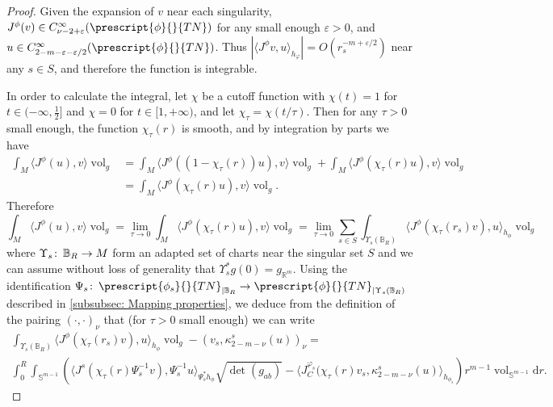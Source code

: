 \documentclass{article}
\numberwithin{equation}{section}        %
\theoremstyle{bfnote}
\theoremstyle{definition}
\theoremstyle{bfremark}
\newcommand{\col}{\colon \thinspace}        %
\newcommand{\R}{\mathbb{R}}                 %
\newcommand{\Ball}{\mathbb{B}}              %
\newcommand{\Sp}{\mathbb{S}}                %
\newcommand{\diff}{\mathrm{d}}                      %
\DeclareMathOperator{\vol}{vol}                 %
\begin{document}
\begin{proof}
    Given the expansion of $v$ near each singularity, $J^\phi(v) \in C^\infty_{\nu-2+\varepsilon}(\prescript{\phi}{}{TN})$ for any small enough $\varepsilon > 0$, and $u \in C^\infty_{2-m-\varepsilon-\varepsilon/2}(\prescript{\phi}{}{TN})$. Thus $|\langle J^\phi v, u \rangle_{h_\varphi}| = O(r_s^{-m+\varepsilon/2})$ near any $s \in S$, and therefore the function is integrable. 

    In order to calculate the integral, let $\chi$ be a cutoff function with $\chi(t) = 1$ for $t \in (-\infty,\tfrac{1}{2}]$ and $\chi = 0$ for $t \in [1,+\infty)$, and let $\chi_\tau = \chi(t/\tau)$. Then for any $\tau > 0$ small enough, the function $\chi_\tau(r)$ is smooth, and by integration by parts we have
    \begin{align*}
        \int_M \langle J^\phi(u), v \rangle \vol_{g} & = \int_M \langle J^\phi((1-\chi_\tau(r))u), v \rangle \vol_{g} + \int_M \langle J^\phi(\chi_\tau(r)u), v \rangle \vol_{g} \\
        & = \int_M \langle J^\phi(\chi_\tau(r)u), v \rangle \vol_{g} .
    \end{align*}
    Therefore
    \begin{equation*}
        \int_M \langle J^\phi(u), v \rangle \vol_{g} = \lim_{\tau \rightarrow 0} \int_M \langle J^\phi(\chi_\tau(r)u), v \rangle \vol_{g} = \lim_{\tau \rightarrow 0} \sum_{s \in S} \int_{\Upsilon_s(\Ball_R)} \langle J^\phi(\chi_\tau(r_s)v), u \rangle_{h_\phi} \vol_{g}
    \end{equation*}
    where $\Upsilon_s \col \Ball_R \to M$ form an adapted set of charts near the singular set $S$ and we can assume without loss of generality that $\Upsilon^*_sg(0) = g_{\R^m}$. Using the identification $\Psi_s \col \prescript{\phi_s}{}{TN}_{|\Ball_R} \rightarrow \prescript{\phi}{}{TN}_{|\Upsilon_s(\Ball_R)}$ described in \cref{subsubsec: Mapping properties}, we deduce from the definition of the pairing $(\cdot,\cdot)_\nu$ that (for $\tau > 0$ small enough) we can write
    \begin{multline*}
        \int_{\Upsilon_s(\Ball_R)} \langle J^\phi(\chi_\tau(r_s)v), u \rangle_{h_\phi} \vol_{g} - (v_s, \kappa_{2-m-\nu}^s(u) )_\nu= \\ \int_0^R \int_{\Sp^{m-1}} \left( \langle J^s(\chi_\tau(r) \Psi_s^{-1}v), \Psi_s^{-1} u \rangle_{\Psi_s^*h_{\phi}} \sqrt{\det(g_{ab})} - \langle J^{\varphi_s}_C(\chi_\tau(r) v_s, \kappa^s_{2-m-\nu}(u) \rangle_{h_{\phi_s}} \right) r^{m-1} \vol_{\Sp^{m-1}} \diff  r .
    \end{multline*}

\end{proof}
\end{document}
